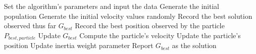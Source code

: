 \documentclass{article}
\begin{document}
\begin{algorithm}
	\renewcommand{\thealgorithm}{}
	\caption{Particle Swarm Optimization}\label{alg:cap}
	\begin{algorithmic}
		\State Set the algorithm's parameters and input the data
		\State Generate the initial population
		\State Generate the initial velocity values randomly
        \State Record the best solution observed thus far $G_{best}$
        \State Record the best position observed by the particle $P_{best,particle}$
		\EndFor
        \State Update $G_{best}$
		\EndIf
        \State Compute the particle's velocity
        \State Update the particle's position
		\EndFor
        \State Update inertia weight parameter
		\EndWhile
        \State Report $G_{best}$ as the solution
	\end{algorithmic}

\end{algorithm}
\end{document}
